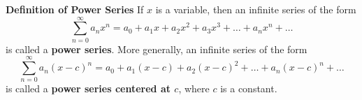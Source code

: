 \nopagenumbers
{\bf Definition of Power Series}
\vskip 6pt
If $x$ is a variable, then an infinite series of the form $$\sum_{n=0}^\infty a_nx^n=a_0+a_1x+a_2x^2+a_3x^3+\ldots+a_nx^n+\ldots$$ is called a {\bf power series}. More generally, an infinite series of the form $$\sum_{n=0}^\infty a_n(x-c)^n=a_0+a_1(x-c)+a_2(x-c)^2+\ldots+a_n(x-c)^n+\ldots$$ is called a {\bf power series centered at $c$}, where $c$ is a constant.
\vfill\eject
